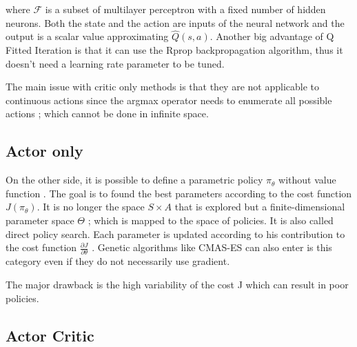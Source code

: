 
where $\mathcal{F}$ is a subset of multilayer perceptron with a fixed number of hidden neurons.
Both the state and the action are inputs of the neural network and the output is a scalar value
approximating $\hat{Q}(s,a)$. Another big advantage of Q Fitted Iteration is that it can use
the Rprop \cite{Igel2000} backpropagation algorithm, thus it doesn't need a learning rate parameter
to be tuned.

The main issue with critic only methods is that they are not applicable to continuous actions since
the argmax operator needs to enumerate all possible actions ; which cannot be done in infinite space.

\subsection{Actor only}

On the other side, it is possible to define a parametric policy $\pi_{\theta}$ without value function \cite{Sutton1999}.
The goal is to found the best parameters according to the cost function $J(\pi_{\theta})$. 
It is no longer the space $S \times A$ that is explored but a finite-dimensional parameter space $\Theta$ ;
which is mapped to the space of policies. It is also called direct policy search.
Each parameter is updated according to his contribution to the cost function 
$ \frac{\partial J}{\partial \theta} $ \cite{Kober2010a}.
Genetic algorithms like CMAS-ES \cite{Hansen2001} can also enter is this category even if 
they do not necessarily use gradient.

The major drawback is the high variability of the cost J which can result in poor policies.

\subsection{Actor Critic}

